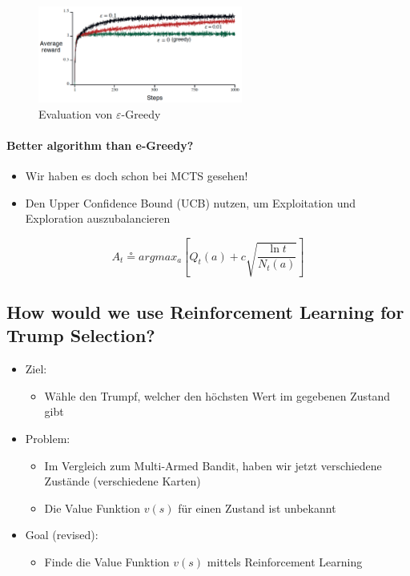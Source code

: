 \documentclass[a4paper]{article}
\begin{document}
		\begin{figure}[htb!]
			\centering
			\includegraphics[width=0.6\textwidth]{img/08_reinforcement_learning/e_greedy.png}
			\caption{Evaluation von $\varepsilon$-Greedy}
		\end{figure}
	
		\paragraph{Better algorithm than e-Greedy?}
		
		\begin{itemize}
			\item Wir haben es doch schon bei MCTS gesehen!
			\item Den Upper Confidence Bound (UCB) nutzen, um Exploitation und Exploration auszubalancieren
		\end{itemize}
	
		$$ A_t \circeq arg max_a\left[ Q_t(a) + c \sqrt{\frac{\ln t}{N_t(a)}} \right] $$
		
		\newpage
		
		\subsection{How would we use Reinforcement Learning for Trump Selection?}
		
		\begin{itemize}
			\item Ziel:
				\begin{itemize}
					\item Wähle den Trumpf, welcher den höchsten Wert im gegebenen Zustand gibt
				\end{itemize}
			\item Problem:
				\begin{itemize}
					\item Im Vergleich zum Multi-Armed Bandit, haben wir jetzt verschiedene Zustände (verschiedene Karten)
					\item Die Value Funktion $v(s)$ für einen Zustand ist unbekannt
				\end{itemize}
			\item Goal (revised): 
				\begin{itemize}
					\item Finde die Value Funktion $v(s)$ mittels Reinforcement Learning
				\end{itemize}
		\end{itemize}
	
\end{document}
